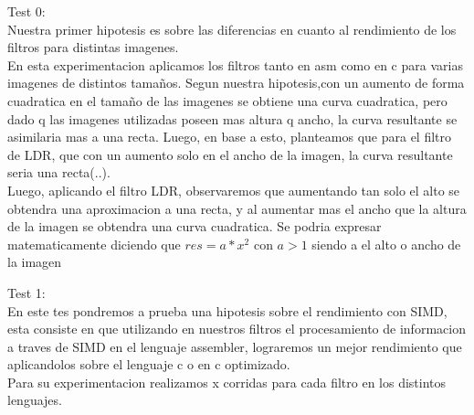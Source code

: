 Test 0:\\
Nuestra primer hipotesis es sobre las diferencias en cuanto al rendimiento de los filtros para distintas imagenes.\\
En esta experimentacion aplicamos los filtros tanto en asm como en c para varias imagenes de distintos tamaños. Segun nuestra hipotesis,con un aumento de forma cuadratica en el tamaño de las imagenes se obtiene una curva cuadratica, pero dado q las imagenes utilizadas poseen mas altura q ancho, la curva resultante se asimilaria mas a una recta. Luego, en base a esto, planteamos que para el filtro de LDR, que con un aumento solo en el ancho de la imagen, la curva resultante seria una recta(..).\\Luego, aplicando el filtro LDR, observaremos que aumentando tan solo el alto se obtendra una aproximacion a una recta, y al aumentar mas el ancho que la altura de la imagen se obtendra una curva cuadratica. Se podria expresar matematicamente diciendo que $res=a*x^2$ con $a>1$ siendo a el alto o ancho de la imagen



Test 1:\\En este tes pondremos a prueba una hipotesis sobre el rendimiento con SIMD, esta consiste en que utilizando en nuestros filtros el procesamiento de informacion a traves de SIMD en el lenguaje assembler, lograremos un mejor rendimiento que aplicandolos sobre el lenguaje c o en c optimizado.
\\Para su experimentacion realizamos x corridas para cada filtro en los distintos lenguajes.




